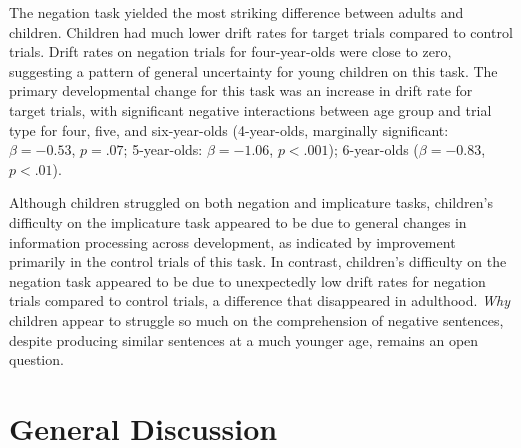 \documentclass[10pt,letterpaper]{article}
\newcommand{\ejy}[1]{\textcolor{Blue}{[ejy: #1]}}
\newcommand{\aen}[1]{\textcolor{DarkOrange}{[aen: #1]}}
\begin{document}
The negation task yielded the most striking difference between adults and children. Children had much lower drift rates for target trials compared to control trials. Drift rates on negation trials for four-year-olds were close to zero, suggesting a pattern of general uncertainty for young children on this task. The primary developmental change for this task was an increase in drift rate for target trials, with significant negative interactions between age group and trial type for four, five, and six-year-olds (4-year-olds, marginally significant: $\beta = -0.53$, $p = .07$; 5-year-olds: $\beta = -1.06$, $p <.001$); 6-year-olds ($\beta = -0.83$, $p < .01$).



Although children struggled on both negation and implicature tasks, children's difficulty on the implicature task appeared to be due to general changes in information processing across development, as indicated by improvement primarily in the control trials of this task. In contrast, children's difficulty on the negation task appeared to be due to unexpectedly low drift rates for negation trials compared to control trials, a difference that disappeared in adulthood. \emph{Why} children appear to struggle so much on the comprehension of negative sentences, despite producing similar sentences at a much younger age, remains an open question.


\section{General Discussion}
\end{document}
